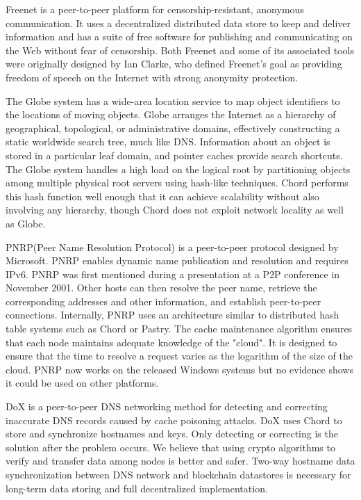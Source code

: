 \documentclass[twocolumn]{article}
\begin{document}
Freenet is a peer-to-peer platform for censorship-resistant, anonymous communication. It uses a decentralized distributed data store to keep and deliver information and has a suite of free software for publishing and communicating on the Web without fear of censorship. Both Freenet and some of its associated tools were originally designed by Ian Clarke, who defined Freenet's goal as providing freedom of speech on the Internet with strong anonymity protection.

The Globe system has a wide-area location service to map object identifiers to the locations of moving objects. Globe arranges the Internet as a hierarchy of geographical, topological, or administrative domains, effectively constructing a static worldwide search tree, much like DNS. Information about an object is stored in a particular leaf domain, and pointer caches provide search shortcuts. The Globe system handles a high load on the logical root by partitioning objects among multiple physical root servers using hash-like techniques. Chord performs this hash function well enough that it can achieve scalability without also involving any hierarchy, though Chord does not exploit network locality as well as Globe.

PNRP(Peer Name Resolution Protocol) is a peer-to-peer protocol designed by Microsoft. PNRP enables dynamic name publication and resolution and requires IPv6. PNRP was first mentioned during a presentation at a P2P conference in November 2001. Other hosts can then resolve the peer name, retrieve the corresponding addresses and other information, and establish peer-to-peer connections. Internally, PNRP uses an architecture similar to distributed hash table systems such as Chord or Pastry. The cache maintenance algorithm ensures that each node maintains adequate knowledge of the "cloud". It is designed to ensure that the time to resolve a request varies as the logarithm of the size of the cloud. PNRP now works on the released Windows systems but no evidence shows it could be used on other platforms.

DoX is a peer-to-peer DNS networking method for detecting and correcting inaccurate DNS records caused by cache poisoning attacks. DoX uses Chord to store and synchronize hostnames and keys. Only detecting or correcting is the solution after the problem occurs. We believe that using crypto algorithms to verify and transfer data among nodes is better and safer. Two-way hostname data synchronization between DNS network and blockchain datastores is necessary for long-term data storing and full decentralized implementation.
\end{document}
